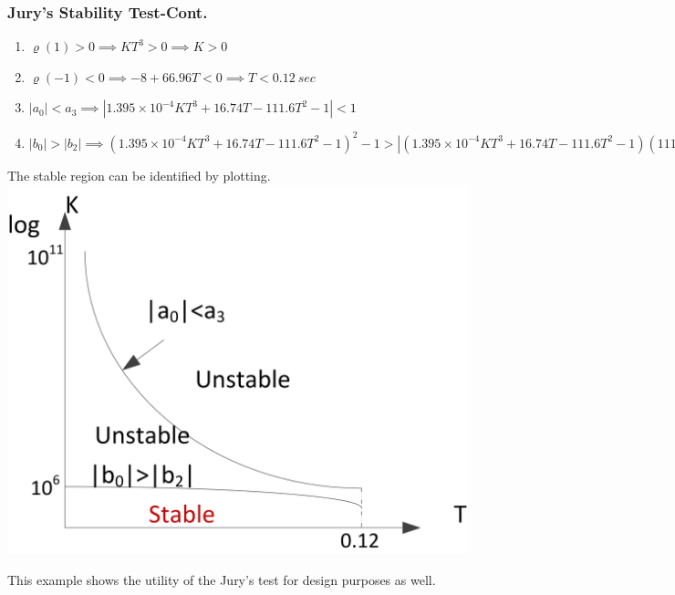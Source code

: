 \documentclass[mathserif, 10pt]{beamer} %
\begin{document}
\frame
{
\normalsize

\frametitle{Jury's Stability Test-Cont.}

\begin{enumerate}
	\item $\varrho(1)>0 \implies KT^3>0 \implies K>0$
	\item $\varrho(-1)<0 \implies -8+66.96 T<0 \implies T<0.12~sec $
	\item $|a_0|<a_3 \implies |1.395 \times 10^{-4}KT^3+16.74T-111.6T^2-1|<1 $
	\item $|b_0|>|b_2| \implies (1.395 \times 10^{-4}KT^3+16.74T-111.6T^2-1)^2-1> |(1.395 \times 10^{-4}KT^3+16.74T-111.6T^2-1)(111.6 T^2+16.74T-3)-(3-33.48T+1.395 \times 10^{-4}KT^3)| $
\end{enumerate}
The stable region can be identified by plotting. \\

\includegraphics[width=.3\linewidth]{./Figures/rangekt.png} \vspace{.05in}

This example shows the utility of the Jury's test for design purposes as well.
}
\end{document}

